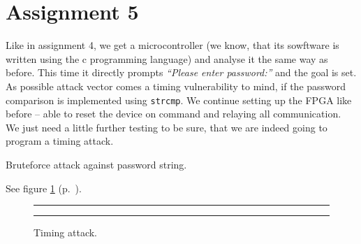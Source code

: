 \section*{Assignment 5}
%
% 

Like in assignment 4, we get a microcontroller (we know, that its sowftware is written using the c programming language) and analyse it the same way as before. 
This time it directly prompts \textit{``Please enter password:''} and the goal is set. As possible attack vector comes a timing vulnerability to mind, if the password comparison is implemented using \texttt{strcmp}. We continue setting up the FPGA like before -- able to reset the device on command and relaying all communication. We just need a little further testing to be sure, that we are indeed going to program a timing attack.

Bruteforce attack against password string. 

See figure \ref{fig:as5-schematic} (p.~\pageref{fig:as5-schematic}).

\begin{figure}[hb]
    \begin{center}
        \hrule\vspace{1em}
        
        \caption{Timing attack.}
        \label{fig:as5-schematic}
        \vspace{1em}\hrule
    \end{center}
\end{figure}
